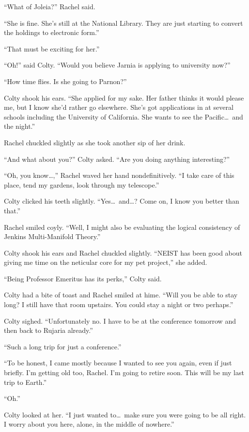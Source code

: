 ``What of Joleia?'' Rachel said.

``She is fine. She's still at the National Library. They are just starting to convert the
holdings to electronic form.''

``That must be exciting for her.''

``Oh!'' said Colty. ``Would you believe Jarnia is applying to university now?''

``How time flies. Is she going to Parnon?''

Colty shook his ears. ``She applied for my sake. Her father thinks it would please me, but I
know she'd rather go elsewhere. She's got applications in at several schools including the
University of California. She wants to see the Pacific\ldots\ and the night.''

Rachel chuckled slightly as she took another sip of her drink.

``And what about you?'' Colty asked. ``Are you doing anything interesting?''

``Oh, you know\ldots,'' Rachel waved her hand nondefinitively. ``I take care of this place, tend
my gardens, look through my telescope.''

Colty clicked his teeth slightly. ``Yes\ldots\ and\ldots? Come on, I know you better than
that.''

Rachel smiled coyly. ``Well, I might also be evaluating the logical consistency of Jenkins
Multi-Manifold Theory.''

Colty shook his ears and Rachel chuckled slightly. ``NEIST has been good about giving me time on
the neticular core for my pet project,'' she added.

``Being Professor Emeritus has its perks,'' Colty said.

Colty had a bite of toast and Rachel smiled at hime. ``Will you be able to stay long? I still
have that room upstairs. You could stay a night or two perhaps.''

Colty sighed. ``Unfortunately no. I have to be at the conference tomorrow and then back to
Rujaria already.''

``Such a long trip for just a conference.''

``To be honest, I came mostly because I wanted to see you again, even if just briefly. I'm
getting old too, Rachel. I'm going to retire soon. This will be my last trip to Earth.''

``Oh.''

Colty looked at her. ``I just wanted to\ldots\ make sure you were going to be all right. I worry
about you here, alone, in the middle of nowhere.''

